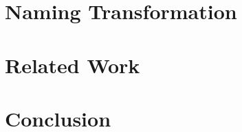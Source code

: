 \documentclass[nonacm]{acmart}
\begin{document}
\section{Naming Transformation}
\label{sec:naming-transformation}


\section{Related Work}
\label{sec:related-work}


\section{Conclusion}
\label{sec:conclusion}



\end{document}
